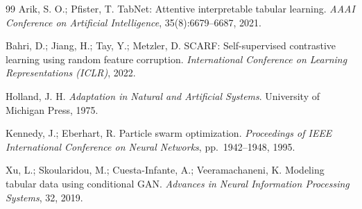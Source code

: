 \documentclass[12pt,a4paper]{article}
\begin{document}
\begin{thebibliography}{99}
Arik, S. O.; Pfister, T.
\newblock TabNet: Attentive interpretable tabular learning.
\newblock \textit{AAAI Conference on Artificial Intelligence}, 35(8):6679--6687, 2021.

Bahri, D.; Jiang, H.; Tay, Y.; Metzler, D.
\newblock SCARF: Self-supervised contrastive learning using random feature corruption.
\newblock \textit{International Conference on Learning Representations (ICLR)}, 2022.

Holland, J. H.
\newblock \textit{Adaptation in Natural and Artificial Systems}.
\newblock University of Michigan Press, 1975.

Kennedy, J.; Eberhart, R.
\newblock Particle swarm optimization.
\newblock \textit{Proceedings of IEEE International Conference on Neural Networks}, pp.~1942--1948, 1995.

Xu, L.; Skoularidou, M.; Cuesta-Infante, A.; Veeramachaneni, K.
\newblock Modeling tabular data using conditional GAN.
\newblock \textit{Advances in Neural Information Processing Systems}, 32, 2019.

\end{thebibliography}
\end{document}
